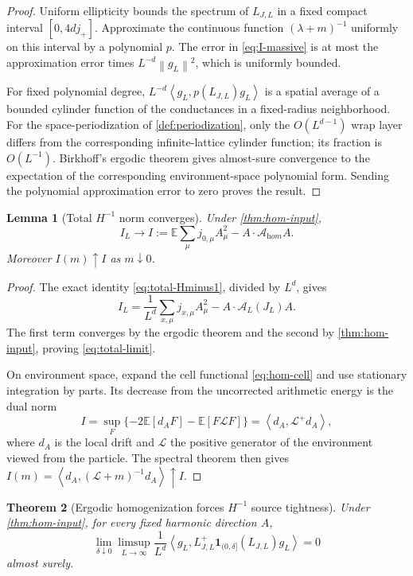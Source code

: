 \documentclass[11pt]{article}
\newtheorem{theorem}{Theorem}[section]
\newtheorem{lemma}[theorem]{Lemma}
\theoremstyle{definition}
\theoremstyle{remark}
\newcommand{\E}{\mathbb E}
\newcommand{\cA}{\mathcal A}
\newcommand{\ip}[2]{\left\langle #1,#2\right\rangle}
\newcommand{\norm}[1]{\left\lVert #1\right\rVert}
\begin{document}
\begin{proof}
Uniform ellipticity bounds the spectrum of $L_{J,L}$ in a fixed compact interval $[0,4dj_+]$.  Approximate the continuous function $(\lambda+m)^{-1}$ uniformly on this interval by a polynomial $p$.  The error in \eqref{eq:I-massive} is at most the approximation error times $L^{-d}\norm{g_L}^2$, which is uniformly bounded.

For fixed polynomial degree, $L^{-d}\ip{g_L}{p(L_{J,L})g_L}$ is a spatial average of a bounded cylinder function of the conductances in a fixed-radius neighborhood.  For the space-periodization of \cref{def:periodization}, only the $O(L^{d-1})$ wrap layer differs from the corresponding infinite-lattice cylinder function; its fraction is $O(L^{-1})$.  Birkhoff's ergodic theorem gives almost-sure convergence to the expectation of the corresponding environment-space polynomial form.  Sending the polynomial approximation error to zero proves the result.
\end{proof}

\begin{lemma}[Total $H^{-1}$ norm converges]
\label{lem:total-convergence}
Under \cref{thm:hom-input},
\begin{equation}
 I_L\longrightarrow
 I:=\E\sum_{\mu}j_{0,\mu}A_\mu^2-A\cdot\cA_{\mathrm hom}A.
 \label{eq:total-limit}
\end{equation}
Moreover $I(m)\uparrow I$ as $m\downarrow0$.
\end{lemma}

\begin{proof}
The exact identity \eqref{eq:total-Hminus1}, divided by $L^d$, gives
\[
 I_L=\frac1{L^d}\sum_{x,\mu}j_{x,\mu}A_\mu^2
 -A\cdot\cA_L(J_L)A.
\]
The first term converges by the ergodic theorem and the second by \cref{thm:hom-input}, proving \eqref{eq:total-limit}.

On environment space, expand the cell functional \eqref{eq:hom-cell} and use stationary integration by parts.  Its decrease from the uncorrected arithmetic energy is the dual norm
\[
 I=\sup_F\{-2\E[d_AF]-\E[F\mathscr L F]\}
 =\ip{d_A}{\mathscr L^+d_A},
\]
where $d_A$ is the local drift and $\mathscr L$ the positive generator of the environment viewed from the particle.  The spectral theorem then gives
$I(m)=\ip{d_A}{(\mathscr L+m)^{-1}d_A}\uparrow I$.
\end{proof}

\begin{theorem}[Ergodic homogenization forces $H^{-1}$ source tightness]
\label{thm:ergodic-tightness}
Under \cref{thm:hom-input}, for every fixed harmonic direction $A$,
\begin{equation}
 \boxed{
 \lim_{\delta\downarrow0}\limsup_{L\to\infty}
 \frac1{L^d}\ip{g_L}{L_{J,L}^+
 \bm{1}_{(0,\delta]}(L_{J,L})g_L}=0}
 \label{eq:ergodic-tightness}
\end{equation}
almost surely.
\end{theorem}
\end{document}
